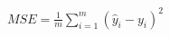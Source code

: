 \documentclass[]{standalone}
\begin{document}
$MSE = \frac{1}{m}\sum_{i=1}^{m}(\hat{y}_i -y_i)^2$
\end{document}
